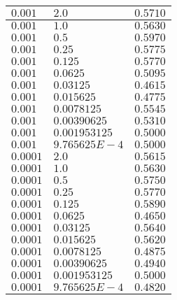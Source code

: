 \begin{enumerate}
\begin{longtable}{| p{}  |  p{} |p{}  |}
      $0.001$ & $2.0$ & $0.5710$ \\
      \hline
      $0.001$ & $1.0$ & $0.5630$ \\
      \hline
      $0.001$ & $0.5$ & $0.5970$ \\
      \hline
      $0.001$ & $0.25$ & $0.5775$ \\
      \hline
      $0.001$ & $0.125$ & $0.5770$ \\
      \hline
      $0.001$ & $0.0625$ & $0.5095$ \\
      \hline
      $0.001$ & $0.03125$ & $0.4615$ \\
      \hline
      $0.001$ & $0.015625$ & $0.4775$ \\
      \hline
      $0.001$ & $0.0078125$ & $0.5545$ \\
      \hline
      $0.001$ & $0.00390625$ & $0.5310$ \\
      \hline
      $0.001$ & $0.001953125$ & $0.5000$ \\
      \hline
      $0.001$ & $9.765625E-4$ & $0.5000$ \\
      \hline
       
      $0.0001$ & $2.0$ & $0.5615$ \\
      \hline
      $0.0001$ & $1.0$ & $0.5630$ \\
      \hline
      $0.0001$ & $0.5$ & $0.5750$ \\
      \hline
      $0.0001$ & $0.25$ & $0.5770$ \\
      \hline
      $0.0001$ & $0.125$ & $0.5890$ \\
      \hline
      $0.0001$ & $0.0625$ & $0.4650$ \\
      \hline
      $0.0001$ & $0.03125$ & $0.5640$ \\
      \hline
      $0.0001$ & $0.015625$ & $0.5620$ \\
      \hline
      $0.0001$ & $0.0078125$ & $0.4875$ \\
      \hline
      $0.0001$ & $0.00390625$ & $0.4940$ \\
      \hline
      $0.0001$ & $0.001953125$ & $0.5000$ \\
      \hline
      $0.0001$ & $9.765625E-4$ & $0.4820$ \\
      \hline
       

\end{longtable}
\end{enumerate}
